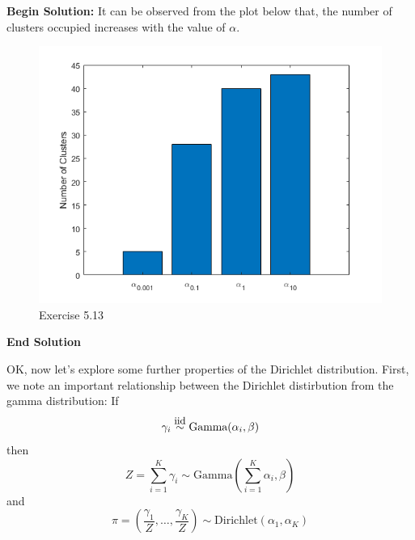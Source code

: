 \documentclass[twoside]{article}
\begin{document}
\textbf{Begin Solution:}
It can be observed from the plot below that, the number of clusters occupied increases with the value of $\alpha$.
\begin{figure}[H]
\begin{center}
\includegraphics[width=\textwidth]{./exercise_5_13/alpha.png}
\end{center}
\caption{Exercise 5.13}
\end{figure}  
\textbf{End Solution}

   OK, now let's explore some further properties of the Dirichlet distribution. First, we note an important relationship between the Dirichlet distirbution from the gamma distribution: If
   $$\gamma_i \stackrel{\mbox{\small{iid}}}{\sim}\mbox{Gamma}(\alpha_i,\beta)$$
   then
   $$Z = \sum_{i=1}^K \gamma_i \sim \mbox{Gamma}\left(\sum_{i=1}^K\alpha_i,\beta\right)$$
   and
   $$\pi = \left(\frac{\gamma_1}{Z},\dots,\frac{\gamma_K}{Z}\right)\sim \mbox{Dirichlet}(\alpha_1,\alpha_K)$$
\end{document}
